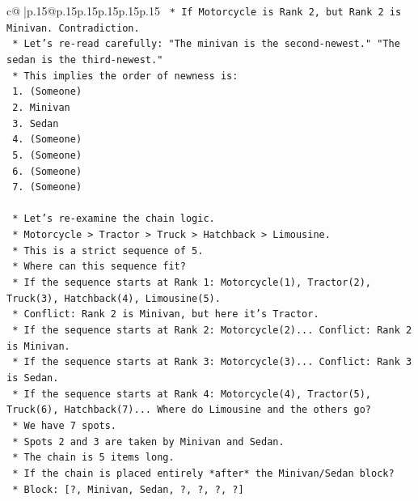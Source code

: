 \documentclass{article}
\begin{document}
{\begin{supertabular}{c@{$\;$}|p{.15\linewidth}@{}p{.15\linewidth}p{.15\linewidth}p{.15\linewidth}p{.15\linewidth}p{.15\linewidth}}
{{{\texttt{            *   If Motorcycle is Rank 2, but Rank 2 is Minivan. Contradiction.} \\
\texttt{        *   Let's re{-}read carefully: "The minivan is the second{-}newest." "The sedan is the third{-}newest."} \\
\texttt{        *   This implies the order of newness is:} \\
\texttt{            1.  (Someone)} \\
\texttt{            2.  Minivan} \\
\texttt{            3.  Sedan} \\
\texttt{            4.  (Someone)} \\
\texttt{            5.  (Someone)} \\
\texttt{            6.  (Someone)} \\
\texttt{            7.  (Someone)} \\
\\ 
\texttt{    *   Let's re{-}examine the chain logic.} \\
\texttt{        *   Motorcycle > Tractor > Truck > Hatchback > Limousine.} \\
\texttt{        *   This is a strict sequence of 5.} \\
\texttt{        *   Where can this sequence fit?} \\
\texttt{        *   If the sequence starts at Rank 1: Motorcycle(1), Tractor(2), Truck(3), Hatchback(4), Limousine(5).} \\
\texttt{            *   Conflict: Rank 2 is Minivan, but here it's Tractor.} \\
\texttt{        *   If the sequence starts at Rank 2: Motorcycle(2)... Conflict: Rank 2 is Minivan.} \\
\texttt{        *   If the sequence starts at Rank 3: Motorcycle(3)... Conflict: Rank 3 is Sedan.} \\
\texttt{        *   If the sequence starts at Rank 4: Motorcycle(4), Tractor(5), Truck(6), Hatchback(7)... Where do Limousine and the others go?} \\
\texttt{            *   We have 7 spots.} \\
\texttt{            *   Spots 2 and 3 are taken by Minivan and Sedan.} \\
\texttt{            *   The chain is 5 items long.} \\
\texttt{            *   If the chain is placed entirely *after* the Minivan/Sedan block?} \\
\texttt{                *   Block: {[}?, Minivan, Sedan, ?, ?, ?, ?{]}} \\
}}}
\end{supertabular}}
\end{document}
